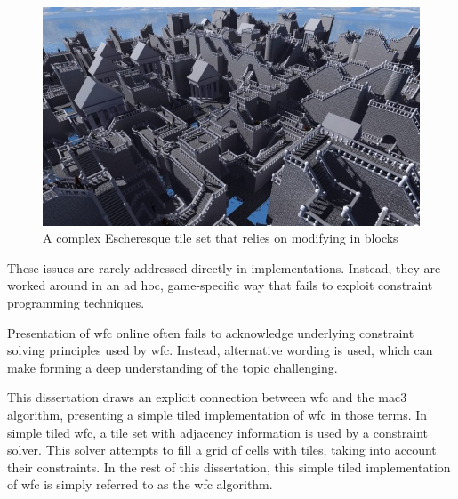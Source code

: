 \begin{figure}[H]
    \centering
    \includegraphics[width=\textwidth, height=0.3\textheight, keepaspectratio]{Images/escher_sample-768x445.jpg}
    \caption{A complex Escheresque tile set that relies on modifying in blocks \cite{model_synthesis_diss}}
    \label{fig:escheresque}
\end{figure}

These issues are rarely addressed directly in implementations. Instead, they are worked around in an ad hoc, game-specific way that fails to exploit constraint programming techniques.

Presentation of \acrshort{wfc} online often fails to acknowledge underlying constraint solving principles used by \acrshort{wfc}. Instead, alternative wording is used, which can make forming a deep understanding of the topic challenging.

This dissertation draws an explicit connection between \acrshort{wfc} and the \acrfull{mac3} algorithm, presenting a simple tiled implementation of \acrshort{wfc} in those terms. In simple tiled \acrshort{wfc}, a tile set with adjacency information is used by a constraint solver. This solver attempts to fill a grid of cells with tiles, taking into account their constraints. In the rest of this dissertation, this simple tiled implementation of \acrshort{wfc} is simply referred to as the \acrshort{wfc} algorithm.

